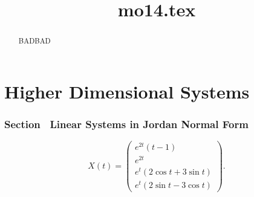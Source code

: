 \documentclass{ximera}
\title{mo14.tex}
\begin{document}
\begin{abstract}
BADBAD
\end{abstract}
\maketitle

\chapter{Higher Dimensional Systems}

\subsection*{Section~\protect{\ref{sec:LinHomSys}} Linear Systems in Jordan
Normal Form}

 \ans 
\[
X(t) =
\left(\begin{array}{c}
e^{2t}(t - 1) \\
e^{2t} \\
e^t(2\cos{t} + 3\sin{t}) \\
e^t(2\sin{t} - 3\cos{t})
\end{array}\right).
\]
\end{document}
